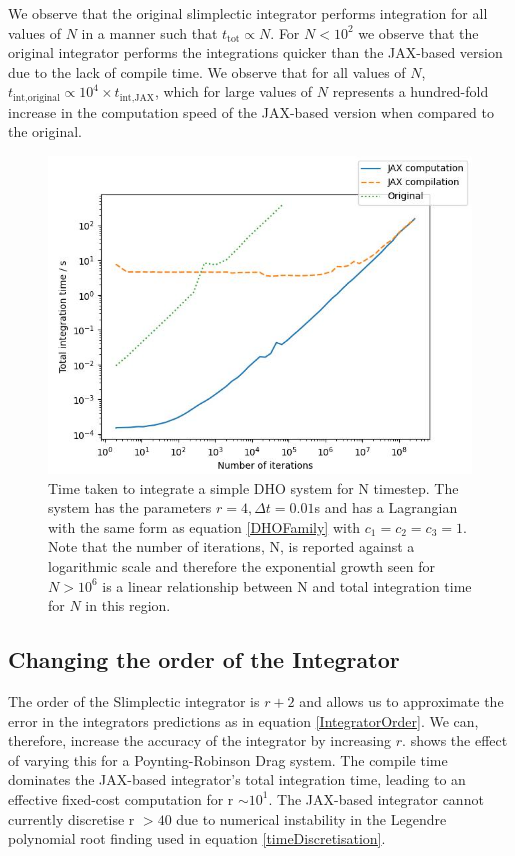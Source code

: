 \documentclass[10pt]{iopart}
\begin{document}
We observe that the original slimplectic integrator performs integration for all values of $N$ in a manner such that $t_{\textrm{tot}} \propto N$. For $N<10^2$ we observe that the original integrator performs the integrations quicker than the JAX-based version due to the lack of compile time. We observe that for all values of $N$, $t_{\textrm{int,original}} \propto 10^4\times t_{\textrm{int,JAX}}$, which for large values of $N$ represents a hundred-fold increase in the computation speed of the JAX-based version when compared to the original.

\begin{figure}
	\centering
	\includegraphics[width=\columnwidth]{NPlot.jpg}
	\caption{Time taken to integrate a simple DHO system for N timestep. The system has the parameters $r=4, \Delta t=0.01$s and has a Lagrangian with the same form as equation \ref{DHOFamily} with $c_1=c_2=c_3=1$. Note that the number of iterations, N, is reported against a logarithmic scale and therefore the exponential growth seen for $N>10^6$ is a linear relationship between N and total integration time for $N$ in this region.}
		\label{nplot}
\end{figure}

\subsection{Changing the order of the Integrator}
The order of the Slimplectic integrator \cite{Tsang_Slimplectic} is $r+2$ and allows us to approximate the error in the integrators predictions as in equation \ref{IntegratorOrder}. We can, therefore, increase the accuracy of the integrator by increasing $r$.  shows the effect of varying this for a Poynting-Robinson Drag system. The compile time dominates the JAX-based integrator's total integration time, leading to an effective fixed-cost computation for r $\sim10^1$. The JAX-based integrator cannot currently discretise r $>40$ due to numerical instability in the Legendre polynomial root finding used in equation \ref{timeDiscretisation}. 
\end{document}
